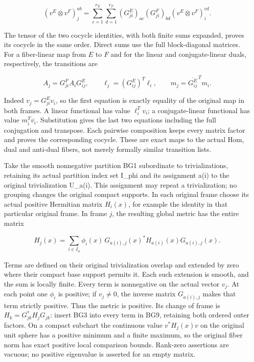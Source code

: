 \documentclass[
  11pt,
]{article}
\begin{document}
\[
 (v^E\otimes v^F)^{ab}_j
   =\sum_{c=1}^{r_E}\sum_{d=1}^{r_F}
       (G^E_{ji})_{ac}(G^F_{ji})_{bd}
       (v^E\otimes v^F)^{cd}_i .
 \tag{BG7}
\]

The tensor of the two cocycle identities, with both finite sums
expanded, proves its cocycle in the same order. Direct sums use the full
block-diagonal matrices. For a fiber-linear map from \(E\) to \(F\) and
for the linear and conjugate-linear duals, respectively, the transitions
are

\[
 A_j=G^F_{ji}A_iG^E_{ij},\qquad
 \ell_j=(G^E_{ij})^T\ell_i,\qquad
 m_j=\overline{G^E_{ij}}^{\,T}m_i .
 \tag{BG8}
\]

Indeed \(v_j=G^E_{ji}v_i\), so the first equation is exactly equality of
the original map in both frames. A linear functional has value
\(\ell_i^Tv_i\); a conjugate-linear functional has value
\(m_i^T\overline{v_i}\). Substitution gives the last two equations
including the full conjugation and transpose. Each pairwise composition
keeps every matrix factor and proves the corresponding cocycle. These
are exact maps to the actual Hom, dual and anti-dual fibers, not merely
formally similar transition lists.

Take the smooth nonnegative partition BG1 subordinate to
trivializations, retaining its actual partition index set I\_phi and its
assignment a(i) to the original trivialization U\_a(i). This assignment
may repeat a trivialization; no grouping changes the original compact
supports. In each original frame choose its actual positive Hermitian
matrix \(H_i(x)\), for example the identity in that particular original
frame. In frame \(j\), the resulting global metric has the entire matrix

\[
 H_j(x)=\sum_{i\in I_\phi}\phi_i(x)\,
                  G_{a(i),j}(x)^*H_{a(i)}(x)G_{a(i),j}(x).
 \tag{BG9}
\]

Terms are defined on their original trivialization overlap and extended
by zero where their compact base support permits it. Each such extension
is smooth, and the sum is locally finite. Every term is nonnegative on
the actual vector \(v_j\). At each point one \(\phi_i\) is positive; if
\(v_j\ne0\), the inverse matrix \(G_{a(i),j}\) makes that term strictly
positive. Thus the metric is positive. Its change of frame is
\(H_k=G_{jk}^*H_jG_{jk}\): insert BG3 into every term in BG9, retaining
both ordered outer factors. On a compact subchart the continuous value
\(v^*H_j(x)v\) on the original unit sphere has a positive minimum and a
finite maximum, so the original fiber norm has exact positive local
comparison bounds. Rank-zero assertions are vacuous; no positive
eigenvalue is asserted for an empty matrix.
\end{document}
